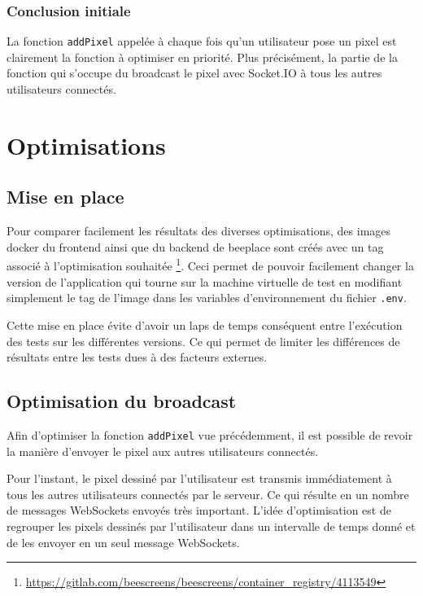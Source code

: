 \subsubsection{Conclusion initiale}

La fonction \texttt{addPixel} appelée à chaque fois qu'un utilisateur pose un pixel est clairement la fonction à optimiser en priorité. Plus précisément, la partie de la fonction qui s'occupe du broadcast le pixel avec Socket.IO à tous les autres utilisateurs connectés.

\section{Optimisations}
\label{sec:optimisations}

\subsection{Mise en place}

Pour comparer facilement les résultats des diverses optimisations, des images \gls{docker} du frontend ainsi que du backend de \gls{beeplace} sont créés avec un tag associé à l'optimisation souhaitée \footnote{\url{https://gitlab.com/beescreens/beescreens/container_registry/4113549}}. Ceci permet de pouvoir facilement changer la version de l'application qui tourne sur la machine virtuelle de test en modifiant simplement le tag de l'image dans les variables d'environnement du fichier \texttt{.env}.

Cette mise en place évite d'avoir un laps de temps conséquent entre l'exécution des tests sur les différentes versions. Ce qui permet de limiter les différences de résultats entre les tests dues à des facteurs externes.

\subsection{Optimisation du broadcast}

Afin d'optimiser la fonction \texttt{addPixel} vue précédemment, il est possible de revoir la manière d'envoyer le pixel aux autres utilisateurs connectés.

Pour l'instant, le pixel dessiné par l'utilisateur est transmis immédiatement à tous les autres utilisateurs connectés par le serveur. Ce qui résulte en un nombre de messages WebSockets envoyés très important. L'idée d'optimisation est de regrouper les pixels dessinés par l'utilisateur dans un intervalle de temps donné et de les envoyer en un seul message WebSockets.

